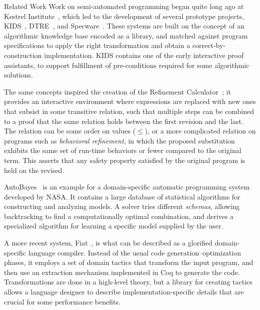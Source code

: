 \begin{paragraph}{Related Work}
Work on semi-automated programming began quite long ago at Kestrel Institute~\cite{AI1985/Smith},
which led to the development of several prototype projects,
KIDS~\cite{TSE1990/Smith}, DTRE~\cite{CPS1991/Blaine}, 
and Specware~\cite{2001/McDonald:specware}.
These systems are built on the concept of an algorithmic knowledge base encoded
as a library, and matched against program specifications to apply the
right transformation and obtain a correct-by-construction implementation.
KIDS contains one of the early interactive proof assistants, to support
fulfillment of pre-conditions required for some algorithmic solutions.

The same concepts inspired the creation of the Refinement Calculator~\cite{TPHOLs1996/Butler};
it provides an interactive environment where expressions are replaced with
new ones that subsist in some transitive relation, such that multiple steps
can be combined to a proof that the same relation holds between the first
revision and the last.
The relation can be some order on values ($\leq$), or a more complicated relation
on programs such as \emph{behavioral refinement}, in which the proposed substitution
exhibits the same set of run-time behaviors or fewer compared to the original
term.
This asserts that any safety property satisfied by the original program is held
on the revised.

AutoBayes~\cite{JFP2003/Fischer} is an example for a domain-specific automatic programming system
developed by NASA.
It contains a large database of statistical algorithms for constructing and
analyzing models.
A solver tries different \emph{schemas}, allowing backtracking to find
a computationally optimal combination, and derives a specialized algorithm
for learning a specific model supplied by the user.

A more recent system, Fiat~\cite{POPL2015/Delaware}, is what can be described
as a glorified domain-specific language compiler.
Instead of the usual code generation--optimization phases, it employs a set
of domain tactics that transform the input program, and then use an extraction
mechanism implemented in Coq to generate the code.
Transformations are done in a high-level theory, but a library for creating
tactics allows a language designer to describe implementation-specific details
that are crucial for some performance benefits.
\end{paragraph}

